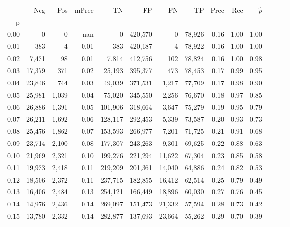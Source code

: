 \begin{tabular}{rrrrrrrrrrrrrr}
\toprule
{} &     Neg &    Pos & mPrec &       TN &       FP &      FN &      TP &  Prec &   Rec & $\hat{p}$ \\
p    &         &        &       &          &          &         &         &       &       &           \\
\midrule
0.00 &       0 &      0 &   nan &        0 &  420,570 &       0 &  78,926 &  0.16 &  1.00 &      1.00 \\
0.01 &     383 &      4 &  0.01 &      383 &  420,187 &       4 &  78,922 &  0.16 &  1.00 &      1.00 \\
0.02 &   7,431 &     98 &  0.01 &    7,814 &  412,756 &     102 &  78,824 &  0.16 &  1.00 &      0.98 \\
0.03 &  17,379 &    371 &  0.02 &   25,193 &  395,377 &     473 &  78,453 &  0.17 &  0.99 &      0.95 \\
0.04 &  23,846 &    744 &  0.03 &   49,039 &  371,531 &   1,217 &  77,709 &  0.17 &  0.98 &      0.90 \\
0.05 &  25,981 &  1,039 &  0.04 &   75,020 &  345,550 &   2,256 &  76,670 &  0.18 &  0.97 &      0.85 \\
0.06 &  26,886 &  1,391 &  0.05 &  101,906 &  318,664 &   3,647 &  75,279 &  0.19 &  0.95 &      0.79 \\
0.07 &  26,211 &  1,692 &  0.06 &  128,117 &  292,453 &   5,339 &  73,587 &  0.20 &  0.93 &      0.73 \\
0.08 &  25,476 &  1,862 &  0.07 &  153,593 &  266,977 &   7,201 &  71,725 &  0.21 &  0.91 &      0.68 \\
0.09 &  23,714 &  2,100 &  0.08 &  177,307 &  243,263 &   9,301 &  69,625 &  0.22 &  0.88 &      0.63 \\
0.10 &  21,969 &  2,321 &  0.10 &  199,276 &  221,294 &  11,622 &  67,304 &  0.23 &  0.85 &      0.58 \\
0.11 &  19,933 &  2,418 &  0.11 &  219,209 &  201,361 &  14,040 &  64,886 &  0.24 &  0.82 &      0.53 \\
0.12 &  18,506 &  2,372 &  0.11 &  237,715 &  182,855 &  16,412 &  62,514 &  0.25 &  0.79 &      0.49 \\
0.13 &  16,406 &  2,484 &  0.13 &  254,121 &  166,449 &  18,896 &  60,030 &  0.27 &  0.76 &      0.45 \\
0.14 &  14,976 &  2,436 &  0.14 &  269,097 &  151,473 &  21,332 &  57,594 &  0.28 &  0.73 &      0.42 \\
0.15 &  13,780 &  2,332 &  0.14 &  282,877 &  137,693 &  23,664 &  55,262 &  0.29 &  0.70 &      0.39 \\

\end{tabular}
